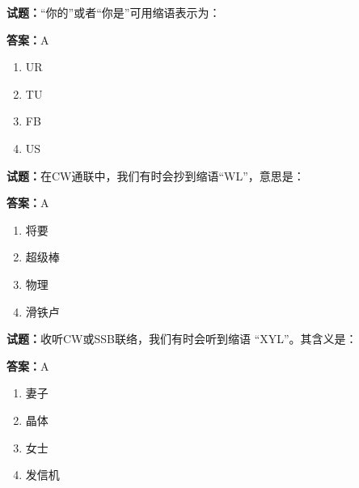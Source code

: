 \documentclass{ctexbook}
\begin{document}




\vspace{1em}

\textbf{试题：}“你的”或者“你是”可用缩语表示为： 

\textbf{答案：}A 

\begin{enumerate}[leftmargin=3em]
  \item UR 

  \item TU 

  \item FB 

  \item US 

\end{enumerate}





\vspace{1em}

\textbf{试题：}在CW通联中，我们有时会抄到缩语“WL”，意思是： 

\textbf{答案：}A 

\begin{enumerate}[leftmargin=3em]
  \item 将要 

  \item 超级棒 

  \item 物理 

  \item 滑铁卢 

\end{enumerate}





\vspace{1em}

\textbf{试题：}收听CW或SSB联络，我们有时会听到缩语 “XYL”。其含义是： 

\textbf{答案：}A 

\begin{enumerate}[leftmargin=3em]
  \item 妻子 

  \item 晶体 

  \item 女士 

  \item 发信机 

\end{enumerate}
\end{document}
